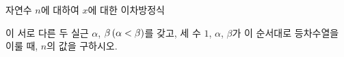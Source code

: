 자연수 $n$에 대하여 $x$에 대한 이차방정식\par\smallskip{}\par\smallskip\noindent 이 서로 다른 두 실근 $\alpha$, $\beta\mkern3mu (\alpha<\beta)$를 갖고, 세 수 $1$, $\alpha$, $\beta$가 이 순서대로 등차수열을 이룰 때, $n$의 값을 구하시오.
